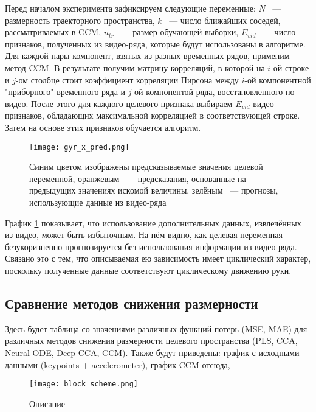 \documentclass[a4paper, 12pt]{article}
\begin{document}
Перед началом эксперимента зафиксируем следующие переменные: $N$ ~--- размерность траекторного пространства, $k$ ~--- число ближайших соседей, рассматриваемых в CCM, $n_{tr}$ ~--- размер обучающей выборки, $E_{vid}$ ~--- число признаков, полученных из видео-ряда, которые будут использованы в алгоритме.
Для каждой пары компонент, взятых из разных временных рядов, применим метод CCM.
В результате получим матрицу корреляций, в которой на $i\text{-ой}$ строке и $j\text{-ом}$ столбце стоит коэффициент корреляции Пирсона между $i\text{-ой}$ компонентной "приборного" временного ряда и $j\text{-ой}$ компонентой ряда, восстановленного по видео. 
После этого для каждого целевого признака выбираем $E_{vid}$ видео-признаков, обладающих максимальной корреляцией в соответствующей строке.
Затем на основе этих признаков обучается алгоритм.

\begin{figure}[bhtp]
	\texttt{[image: gyr\_x\_pred.png]}
	\caption{Синим цветом изображены предсказываемые значения целевой переменной, оранжевым ~--- предсказания, основанные на предыдущих значениях искомой величины, зелёным ~--- прогнозы, использующие данные из видео-ряда}
	\label{fig:1}
\end{figure}

График \ref{fig:1} показывает, что использование дополнительных данных, извлечённых из видео, может быть избыточным. 
На нём видно, как целевая переменная безукоризненно прогнозируется без использования информации из видео-ряда. 
Связано это с тем, что описываемая ею зависимость имеет циклический характер, поскольку полученные данные соответствуют циклическому движению руки.

\subsection{Сравнение методов снижения размерности}
Здесь будет таблица со значениями различных функций потерь (MSE, MAE) для различных методов снижения размерности целевого пространства (PLS, CCA, Neural ODE, Deep CCA, CCM). 
Также будут приведены: график с исходными данными (keypoints + accelerometer), график CCM \href{https://sugiharalab.github.io/EDM_Documentation/algorithms_high_level/}{отсюда}, 

\begin{figure}[bhtp]
	\texttt{[image: block\_scheme.png]}
	\caption{Описание}
	\label{fig:2}
\end{figure}



\end{document}
